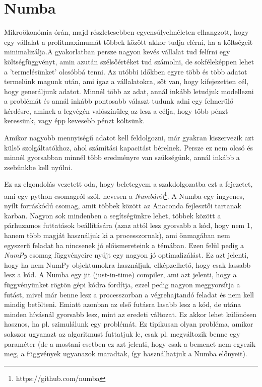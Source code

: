 \documentclass{article}
\theoremstyle{definition}
\theoremstyle{theorem}
\begin{document}
\section{Numba}
Mikroökonómia órán, majd részletesebben egyensúlyelméleten elhangzott, hogy egy vállalat a profitmaximumát többek között akkor tudja elérni, ha a költségeit minimalizálja.A gyakorlatban persze nagyon kevés vállalat tud felírni egy költségfüggvényt, amin azután szélsőértéket tud számolni, de sokféleképpen lehet a 'termelésünket' olcsóbbá tenni. Az utóbbi időkben egyre több és több adatot termelünk magunk után, ami igaz a vállalatokra, sőt van, hogy kifejezetten cél, hogy generáljunk adatot. Minnél több az adat, annál inkább letudjuk modellezni a problémát és annál inkább pontosabb választ tudunk adni egy felmerülő kérdésre, aminek a legvégén valószínűleg az lesz a célja, hogy több pénzt keressünk, vagy épp kevesebb pénzt költsünk.

Amikor nagyobb mennyiségű adatot kell feldolgozni, már gyakran kiszervezik azt külső szolgálta\-tókhoz, ahol számítási kapacitást bérelnek. Persze ez nem olcsó és minnél gyorsabban minnél több eredményre van szükségünk, annál inkább a zsebünkbe kell nyúlni.

Ez az elgondolás vezetett oda, hogy beletegyem a szakdolgozatba ezt a fejezetet, ami egy python csomagról szól, nevesen a \textit{Numbáról}\footnote{https://github.com/numba}.
\newline
A Numba egy ingyenes, nyílt forráskódú csomag, amit többek között az Anaconda fejlesztői tartanak karban. Nagyon sok mindenben a segítségünkre lehet, többek között a párhuzamos futtatások beállítására (azaz attól lesz gyorsabb a kód, hogy nem 1, hanem több magját használjuk ki a processzornak), ami önmagában nem egyszerű feladat ha nincsenek jó előismereteink a témában. Ezen felül pedig a \textit{NumPy} csomag függvényeire nyújt egy nagyon jó optimalizálást. Ez azt jelenti, hogy ha nem NumPy objektumokra használjuk, elképzelhető, hogy csak lassabb lesz a kód.\newline
A Numba egy jit (just-in-time) compiler, ami azt jelenti, hogy a függvényünket rögtön gépi kódra fordítja, ezzel pedig nagyon meggyorsítja a futást, mivel már benne lesz a processzorban a végrehajtandó feladat és nem kell mindig betölteni. Emiatt azonban az első futásra lasabb lesz a kód, de utána minden hívásnál gyorsabb lesz, mint az eredeti változat. Ez akkor lehet különösen hasznos, ha pl. szimulálunk egy problémát. Ez tipikusan olyan probléma, amikor sokszor ugyanazt az algoritmust futtatjuk le, csak pl. megváltozik benne egy paraméter (de a mostani esetben ez azt jelenti, hogy csak a bemenet nem egyezik meg, a függvények ugyanazok maradtak, így használhatjuk a Numba előnyeit).
\end{document}
